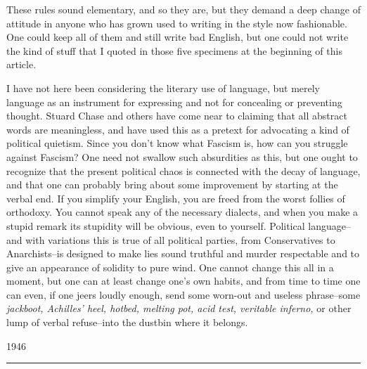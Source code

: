 \documentclass[a4paper]{article}
\begin{document}
These rules sound elementary, and so they are, but they demand a deep change of attitude in anyone who has grown used to writing in the style now fashionable. One could keep all of them and still write bad English, but one could not write the kind of stuff that I quoted in those five specimens at the beginning of this article.

I have not here been considering the literary use of language, but merely language as an instrument for expressing and not for concealing or preventing thought. Stuard Chase and others have come near to claiming that all abstract words are meaningless, and have used this as a pretext for advocating a kind of political quietism. Since you don't know what Fascism is, how can you struggle against Fascism? One need not swallow such absurdities as this, but one ought to recognize that the present political chaos is connected with the decay of language, and that one can probably bring about some improvement by starting at the verbal end. If you simplify your English, you are freed from the worst follies of orthodoxy. You cannot speak any of the necessary dialects, and when you make a stupid remark its stupidity will be obvious, even to yourself. Political language--and with variations this is true of all political parties, from Conservatives to Anarchists--is designed to make lies sound truthful and murder respectable and to give an appearance of solidity to pure wind. One cannot change this all in a moment, but one can at least change one's own habits, and from time to time one can even, if one jeers loudly enough, send some worn-out and useless phrase--some \textit{jackboot, Achilles' heel, hotbed, melting pot, acid test, veritable inferno,} or other lump of verbal refuse--into the dustbin where it belongs.

\bigskip

\hfill \begin{minipage}{0.05\linewidth}
            1946
           \end{minipage}
           
\bigskip

\hrule
\end{document}
